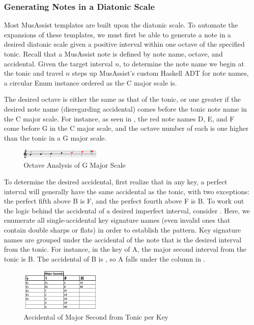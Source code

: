 \documentclass{article}
\begin{document}
\subsubsection{Generating Notes in a Diatonic Scale}
\label{sec:note_generate}
Most MusAssist templates are built upon the diatonic scale. To automate the expansions of these templates, we must first be able to generate a note in a desired diatonic scale given a positive interval within one octave of the specified tonic. Recall that a MusAssist note is defined by note name, octave, and accidental. Given the target interval $n$, to determine the note name we begin at the tonic and travel $n$ steps up MusAssist’s custom Haskell ADT for note names, a circular Enum instance ordered as the C major scale is. 

The desired octave is either the same as that of the tonic, or one greater if the desired note name (disregarding accidental) comes before the tonic note name in the C major scale. For instance, as seen in , the red note names D, E, and F come before G in the C major scale, and the octave number of each is one higher than the tonic in a G major scale.


\begin{figure}[h!]
\centering
\includegraphics[width=0.35\textwidth]{images/note_octave_logic}
\caption{\centering Octave Analysis of G Major Scale}
\label{note_octaves}
\vspace{-2mm}
\end{figure}

To determine the desired accidental, first realize that in any key, a perfect interval will generally have the same accidental as the tonic, with two exceptions: the perfect fifth above B is F\musSharp, and the perfect fourth above F is B\musFlat. To work out the logic behind the accidental of a desired imperfect interval, consider . Here, we enumerate all single-accidental key signature names (even invalid ones that contain double sharps or flats) in order to establish the pattern. Key signature names are grouped under the accidental of the note that is the desired interval from the tonic. For instance, in the key of A\musFlat\;, the major second interval from the tonic is B\musFlat. The accidental of B\musFlat\; is \musFlat, so A\musFlat\; falls under the \musFlat\; column in .

\begin{figure}[h!]
\centering
\includegraphics[width=0.35\textwidth]{images/maj_seconds}
\caption{Accidental of Major Second from Tonic per Key}
\label{maj_seconds}
\vspace{-1mm}
\end{figure}
\end{document}
